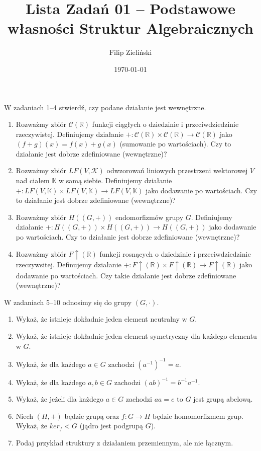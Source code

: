 \documentclass{article}
\title{Lista Zadań 01 -- Podstawowe własności Struktur Algebraicznych}
\author{Filip Zieliński}
\date{\today}
\begin{document}
\maketitle

W zadaniach 1--4 stwierdź, czy podane działanie jest wewnętrzne.
\begin{enumerate}
    \item Rozważmy zbiór $\mathcal{C}(\mathbb{R})$ funkcji ciągłych o dziedzinie i przeciwdziedzinie rzeczywistej. Definiujemy działanie $+ : \mathcal{C}(\mathbb{R}) \times \mathcal{C}(\mathbb{R}) \rightarrow \mathcal{C}(\mathbb{R})$ jako $(f + g)(x) = f(x) + g(x)$ (sumowanie po wartościach). Czy to działanie jest dobrze zdefiniowane (wewnętrzne)?
    \item Rozważmy zbiór $LF(V,\mathcal{K})$ odwzorowań liniowych przestrzeni wektorowej $V$ nad ciałem $\mathbb{K}$ w samą siebie. Definiujemy działanie $+ : LF(V,\mathbb{K}) \times LF(V, \mathbb{K}) \rightarrow LF(V,\mathbb{K})$ jako dodawanie po wartościach. Czy to działanie jest dobrze zdefiniowane (wewnętrzne)?
    \item Rozważmy zbiór $H((G, +))$ endomorfizmów grupy $G$. Definiujemy działanie $+ : H((G, +)) \times H((G, +)) \rightarrow H((G, +))$ jako dodawanie po wartościach. Czy to działanie jest dobrze zdefiniowane (wewnętrzne)?
    \item Rozważmy zbiór $F\uparrow(\mathbb{R})$ funkcji rosnących o dziedzinie i przeciwdziedzinie rzeczywsitej. Definujemy działanie $ + : F\uparrow(\mathbb{R}) \times F\uparrow(\mathbb{R}) \rightarrow F\uparrow(\mathbb{R})$ jako dodawanie po wartościach. Czy takie działanie jest dobrze zdefiniowane (wewnętrzne)?
\end{enumerate}

W zadaniach 5--10 odnosimy się do grupy $(G,\cdot)$.
\begin{enumerate}[resume]
    \item Wykaż, że istnieje dokładnie jeden element neutralny w $G$.
    \item Wykaż, że istnieje dokładnie jeden element symetryczny dla każdego elementu w $G$.
    \item Wykaż, że dla każdego $a \in G$ zachodzi $ (a^{-1})^{-1} = a$.
    \item Wykaż, że dla każdego $a,b \in G$ zachodzi $ (ab)^{-1} = b^{-1}a^{-1}$.
    \item Wykaż, że jeżeli dla każdego $a \in G$ zachodzi $a a = e$ to $G$ jest grupą abelową.
    \item Niech $(H, +)$ będzie grupą oraz $f : G \rightarrow H$ będzie homomorfizmem grup. Wykaż, że $ker_f < G$ (jądro jest podgrupą $G$).
    \item Podaj przykład struktury z działaniem przemiennym, ale nie łącznym.
\end{enumerate}
\end{document}
